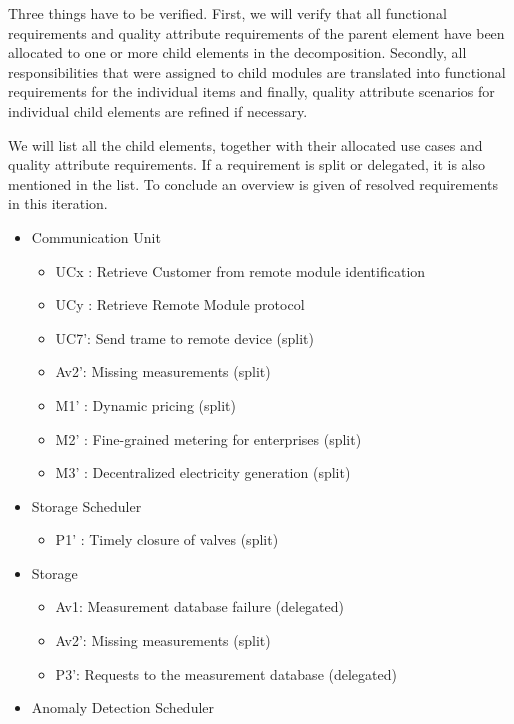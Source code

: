 \npar Three things have to be verified. First, we will verify that all
functional requirements and quality attribute requirements of the parent element
have been allocated to one or more child elements in the decomposition.
Secondly, all responsibilities that were assigned to child modules are
translated into functional requirements for the individual items and finally,
quality attribute scenarios for individual child elements are refined if
necessary.

\npar We will list all the child elements, together with their allocated use
cases and quality attribute requirements. If a requirement is split or
delegated, it is also mentioned in the list. To conclude an overview is given of
resolved requirements in this iteration.

\begin{itemize}
	\item Communication Unit
	\begin{itemize}
	  	\item UCx : Retrieve Customer from remote module identification %
	  	\item UCy : Retrieve Remote Module protocol
		\item UC7': Send trame to remote device (split)
		\item Av2': Missing measurements (split)
		\item M1' : Dynamic pricing (split)
		\item M2' : Fine-grained metering for enterprises (split)
		\item M3' : Decentralized electricity generation (split)
	\end{itemize}
	\item Storage Scheduler
	\begin{itemize}
		\item P1' : Timely closure of valves (split)
	\end{itemize}
	\item Storage
	\begin{itemize}
		\item Av1: Measurement database failure (delegated)
		\item Av2': Missing measurements (split)
	  	\item P3': Requests to the measurement database (delegated)
	\end{itemize}
	\item Anomaly Detection Scheduler

\end{itemize}
